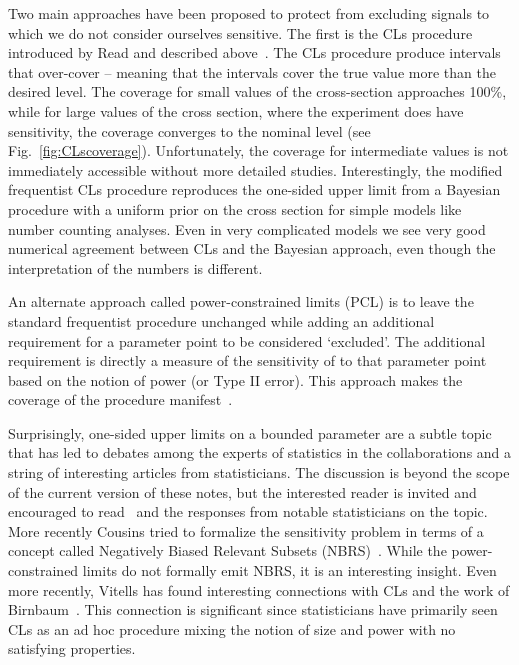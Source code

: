 \documentclass{cernrep}
\begin{document}
Two main approaches have been proposed to protect from excluding signals to which we do not consider ourselves sensitive.  The first is the CLs procedure introduced by Read and described above~\cite{Read2,Read1,CLsWikipedia}.  The CLs procedure produce intervals that over-cover -- meaning that the intervals cover the true value more than the desired level.  The  coverage for small values of the cross-section approaches 100\%, while for large values of the cross section, where the experiment does have sensitivity, the coverage converges to the nominal level  (see Fig.~\ref{fig:CLscoverage}).  Unfortunately, the coverage for intermediate values is not immediately accessible without more detailed studies.  Interestingly, the modified frequentist CLs procedure reproduces the one-sided upper limit from a Bayesian procedure with a uniform prior on the cross section for simple models like number counting analyses.  Even in very complicated models we see very good numerical agreement between CLs and the Bayesian approach, even though the interpretation of the numbers is  different.


An alternate approach called power-constrained limits (PCL) is to leave the standard frequentist procedure unchanged while adding an additional requirement for a parameter point to be considered `excluded'.  The additional requirement is directly a measure of the sensitivity of to that parameter point based on the notion of power (or Type II error).  This approach makes the coverage of the procedure manifest~\cite{2011arXiv1105.3166C}.


Surprisingly, one-sided upper limits on a bounded parameter are a subtle topic that has led to debates among the experts of statistics in the collaborations and a string of interesting articles from statisticians.  The discussion is beyond the scope of the current version of these notes, but the interested reader is invited and encouraged to read~\cite{Mandelkern2002} and the responses from notable statisticians on the topic.  More recently Cousins tried to formalize the sensitivity problem in terms of a concept called Negatively Biased Relevant Subsets (NBRS)~\cite{2011arXiv1109.2023C}.  While the power-constrained limits do not formally emit NBRS, it is an interesting insight.  Even more recently, Vitells has  found interesting connections with CLs and the work of Birnbaum~\cite{Birnbaum:1962,CLsWikipedia}. This connection is significant since statisticians have primarily seen CLs as an ad hoc procedure mixing the notion of size and power with no satisfying properties.
\end{document}
